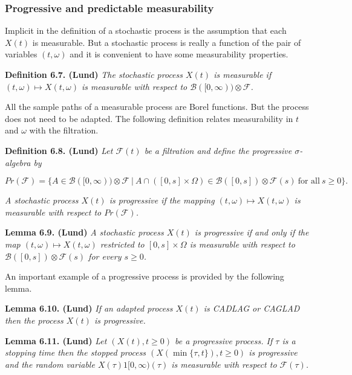 \documentclass[a4paper,10pt,openany]{book}
\begin{document}
\hypertarget{progressive-and-predictable-measurability}{%
\subsubsection{Progressive and predictable measurability}\label{progressive-and-predictable-measurability}}

Implicit in the definition of a stochastic process is the assumption that each \(X(t)\) is measurable. But a stochastic process is really a function of the pair of variables \((t, \omega)\) and it is convenient to have some measurability properties.

\textbf{Definition 6.7. (Lund)} \emph{The stochastic process \(X(t)\) is measurable if \((t,\omega) \mapsto X(t,\omega)\) is measurable with respect to \(\mathcal B([0, \infty)) \otimes \mathcal F\).}

All the sample paths of a measurable process are Borel functions. But the process does not need to be adapted. The following definition relates measurability in \(t\) and \(\omega\) with the filtration.

\textbf{Definition 6.8. (Lund)} \emph{Let \(\mathcal F(t)\) be a filtration and define the progressive \(\sigma\)-algebra by}

\[
Pr(\mathcal F)=\Big\{A\in \mathcal B([0,\infty)) \otimes \mathcal F\ \vert\ A \cap ([0,s] \times \Omega)\in \mathcal B([0,s])\otimes \mathcal F(s)\ \text{for all}\ s\ge 0\Big\}.
\]

\emph{A stochastic process \(X(t)\) is progressive if the mapping \((t,\omega) \mapsto X(t,\omega)\) is measurable with respect to \(Pr(\mathcal F)\).}

\textbf{Lemma 6.9. (Lund)} \emph{A stochastic process \(X(t)\) is progressive if and only if the map \((t,\omega) \mapsto X(t,\omega)\) restricted to \([0, s] \times\Omega\) is measurable with respect to \(\mathcal B([0, s]) \otimes\mathcal F (s)\) for every \(s \ge 0\).}

An important example of a progressive process is provided by the following lemma.

\textbf{Lemma 6.10. (Lund)} \emph{If an adapted process \(X(t)\) is CADLAG or CAGLAD then the process \(X(t)\) is progressive.}

\textbf{Lemma 6.11. (Lund)} \emph{Let \((X (t), t \ge 0)\) be a progressive process. If \(\tau\) is a stopping time then the stopped process \((X(\min\{\tau,t\}),t \ge 0)\) is progressive and the random variable \(X(\tau)1[0,∞)(\tau)\) is measurable with respect to \(\mathcal F(\tau)\).}
\end{document}
